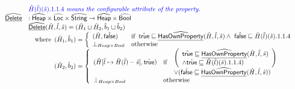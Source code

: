 \documentclass{article}
\newcommand{\SF}[1]{\mbox{\textsf{#1}}}
\newcommand{\wherec}[1]{{\rm where}\begin{array}[t]{l}#1\end{array}}
\newcommand{\ifc}[1]{{\rm if}\begin{array}[t]{l}#1\end{array}}
\newcommand{\owc}{{\rm otherwise}}
\newcommand{\abs}[1]{\widehat{\SF{#1}}}
\newcommand{\aHeap}{\abs{Heap}}
\newcommand{\aLoc}{\abs{Loc}}
\newcommand{\ahf}[1]{\widehat{\underline{\sf #1}}}
\newcommand{\atrue}{\hat{\SF{true}}}
\newcommand{\afalse}{\hat{\SF{false}}}
\def\inblue{\color{blue}}
\begin{document}
\[\begin{array}{ll}
& {\inblue \hat{H}(\hat{l})(\hat{s}).1.1.4\textit{ means the configurable attribute of the property.}} \\
\ahf{Delete} & : \aHeap \times \aLoc \times \abs{String} \rightarrow \aHeap
\times \abs{Bool}\\
& \ahf{Delete}(\hat{H},\hat{l},\hat{s})
  = (\hat{H}_1\sqcup\hat{H}_2,\hat{b}_1\sqcup\hat{b}_2)\\
&  \quad\wherec{
    (\hat{H}_1,\hat{b}_1) = \left\{
      \begin{array}{ll}
        (\hat{H},\afalse)
        & \ifc{\atrue\sqsubseteq\ahf{HasOwnProperty}(\hat{H},\hat{l},\hat{s})
          \land\ \afalse\sqsubseteq\hat{H}(\hat{l})(\hat{s}).1.1.4}\\
        \bot_{Heap\times Bool} & \owc \\
      \end{array}
    \right.\\
    (\hat{H}_2,\hat{b}_2) = \left\{
      \begin{array}{ll}
        (\hat{H}[\hat{l}\mapsto \hat{H}(\hat{l}) - \hat{s}],\atrue)
        & \ifc{
          \begin{array}{l}
            \left(
              \begin{array}{l}
              \atrue \sqsubseteq\ahf{HasOwnProperty}(\hat{H},\hat{l},\hat{s})\\
              \land \atrue\sqsubseteq\hat{H}(\hat{l})(\hat{s}).1.1.4)
              \end{array}
            \right)\\
            \vee (\afalse\sqsubseteq\ahf{HasOwnProperty}(\hat{H},\hat{l},\hat{s}))
          \end{array}}\\
        \bot_{Heap\times Bool} & \owc \\
      \end{array}
    \right.\\
  }\\
\\
\end{array}
\]
\end{document}
